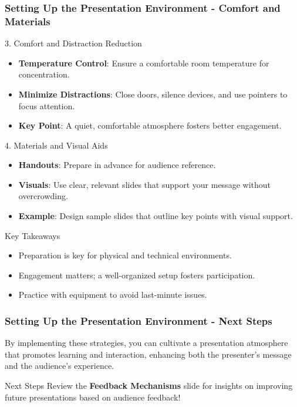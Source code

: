 \documentclass[aspectratio=169]{beamer}
\begin{document}
\begin{frame}[fragile]
    \frametitle{Setting Up the Presentation Environment - Comfort and Materials}
    \begin{block}{3. Comfort and Distraction Reduction}
        \begin{itemize}
            \item \textbf{Temperature Control}: Ensure a comfortable room temperature for concentration.
            \item \textbf{Minimize Distractions}: Close doors, silence devices, and use pointers to focus attention.
            \item \textbf{Key Point}: A quiet, comfortable atmosphere fosters better engagement.
        \end{itemize}
    \end{block}

    \begin{block}{4. Materials and Visual Aids}
        \begin{itemize}
            \item \textbf{Handouts}: Prepare in advance for audience reference.
            \item \textbf{Visuals}: Use clear, relevant slides that support your message without overcrowding.
            \item \textbf{Example}: Design sample slides that outline key points with visual support.
        \end{itemize}
    \end{block}

    \begin{block}{Key Takeaways}
        \begin{itemize}
            \item Preparation is key for physical and technical environments.
            \item Engagement matters; a well-organized setup fosters participation.
            \item Practice with equipment to avoid last-minute issues.
        \end{itemize}
    \end{block}
\end{frame}

\begin{frame}[fragile]
    \frametitle{Setting Up the Presentation Environment - Next Steps}
    By implementing these strategies, you can cultivate a presentation atmosphere that promotes learning and interaction, enhancing both the presenter’s message and the audience's experience. 

    \begin{block}{Next Steps}
        Review the \textbf{Feedback Mechanisms} slide for insights on improving future presentations based on audience feedback!
    \end{block}
\end{frame}
\end{document}
